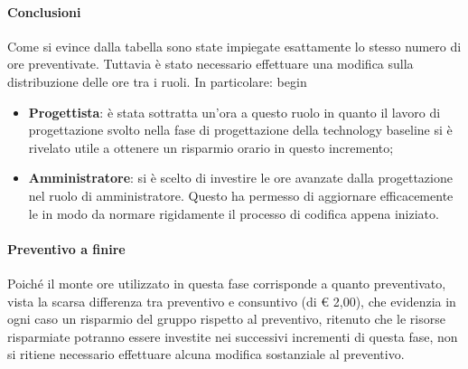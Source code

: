 \paragraph{Conclusioni}
Come si evince dalla tabella sono state impiegate esattamente lo stesso numero di ore preventivate. Tuttavia è stato necessario effettuare una modifica sulla distribuzione delle ore tra i ruoli. In particolare:
begin\begin{itemize}
	\item \textbf{Progettista}: è stata sottratta un'ora a questo ruolo in quanto il lavoro di progettazione svolto nella fase di progettazione della technology baseline si è rivelato utile a ottenere un risparmio orario in questo incremento;
	\item \textbf{Amministratore}: si è scelto di investire le ore avanzate dalla progettazione nel ruolo di amministratore. Questo ha permesso di aggiornare efficacemente le  in modo da normare rigidamente il processo di codifica appena iniziato.
\end{itemize} 

\paragraph{Preventivo a finire}
Poiché il monte ore utilizzato in questa fase corrisponde a quanto preventivato, vista la scarsa differenza tra preventivo e consuntivo (di € 2,00), che evidenzia in ogni caso un risparmio del gruppo rispetto al preventivo, ritenuto che le risorse risparmiate potranno essere investite nei successivi incrementi di questa fase, non si ritiene necessario effettuare alcuna modifica sostanziale al preventivo.

